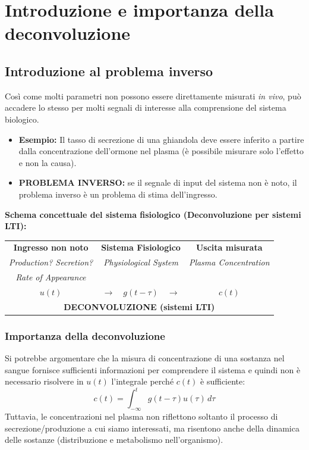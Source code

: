 \chapter{Introduzione e importanza della deconvoluzione}

\section{Introduzione al problema inverso}

Così come molti parametri non possono essere direttamente misurati \textit{in vivo}, può accadere lo stesso per molti segnali di interesse alla comprensione del sistema biologico.

\begin{itemize}
    \item \textbf{Esempio:} Il tasso di secrezione di una ghiandola deve essere inferito a partire dalla concentrazione dell'ormone nel plasma (è possibile misurare solo l'effetto e non la causa).
    \item \textbf{PROBLEMA INVERSO:} se il segnale di input del sistema non è noto, il problema inverso è un problema di stima dell'ingresso.
\end{itemize}

\noindent\textbf{Schema concettuale del sistema fisiologico (Deconvoluzione per sistemi LTI):}
\begin{center}
\begin{tabular}{ccc}
    \textbf{Ingresso non noto} & \textbf{Sistema Fisiologico} & \textbf{Uscita misurata} \\
    \textit{Production? Secretion?} & \textit{Physiological System} & \textit{Plasma Concentration} \\
    \textit{Rate of Appearance} & & \\
    $u(t)$ & $\longrightarrow \quad g(t-\tau) \quad \longrightarrow$ & $c(t)$ \\
    \multicolumn{3}{c}{\textbf{DECONVOLUZIONE (sistemi LTI)}}
\end{tabular}
\end{center}

\subsection{Importanza della deconvoluzione }

Si potrebbe argomentare che la misura di concentrazione di una sostanza nel sangue fornisce sufficienti informazioni per comprendere il sistema e quindi non è necessario risolvere in $u(t)$ l'integrale perché $c(t)$ è sufficiente:
\[
    c(t) = \int_{-\infty}^{t} g(t-\tau) u(\tau) \, d\tau
\]
Tuttavia, le concentrazioni nel plasma non riflettono soltanto il processo di secrezione/produzione a cui siamo interessati, ma risentono anche della dinamica delle sostanze (distribuzione e metabolismo nell'organismo).

